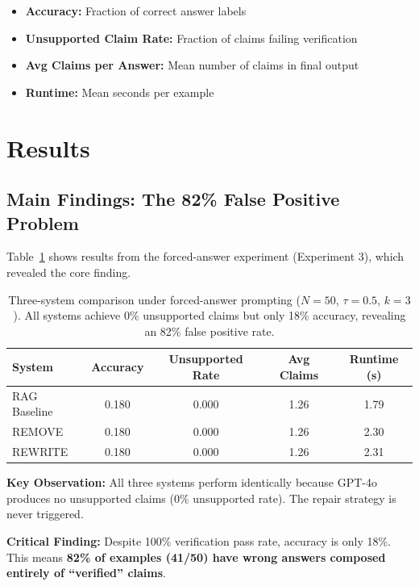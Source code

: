 \documentclass[11pt]{article}
\begin{document}
\begin{itemize}
\item \textbf{Accuracy:} Fraction of correct answer labels
\item \textbf{Unsupported Claim Rate:} Fraction of claims failing verification
\item \textbf{Avg Claims per Answer:} Mean number of claims in final output
\item \textbf{Runtime:} Mean seconds per example
\end{itemize}

\section{Results}

\subsection{Main Findings: The 82\% False Positive Problem}

Table~\ref{tab:main_results} shows results from the forced-answer experiment (Experiment 3), which revealed the core finding.

\begin{table}[h]
\centering
\caption{Three-system comparison under forced-answer prompting ($N=50$, $\tau=0.5$, $k=3$). All systems achieve 0\% unsupported claims but only 18\% accuracy, revealing an 82\% false positive rate.}
\label{tab:main_results}
\begin{tabular}{lcccc}
\toprule
\textbf{System} & \textbf{Accuracy} & \textbf{Unsupported Rate} & \textbf{Avg Claims} & \textbf{Runtime (s)} \\
\midrule
RAG Baseline & 0.180 & 0.000 & 1.26 & 1.79 \\
REMOVE & 0.180 & 0.000 & 1.26 & 2.30 \\
REWRITE & 0.180 & 0.000 & 1.26 & 2.31 \\
\bottomrule
\end{tabular}
\end{table}

\textbf{Key Observation:} All three systems perform identically because GPT-4o produces no unsupported claims ($0\%$ unsupported rate). The repair strategy is never triggered.

\textbf{Critical Finding:} Despite 100\% verification pass rate, accuracy is only 18\%. This means \textbf{82\% of examples (41/50) have wrong answers composed entirely of ``verified'' claims}.
\end{document}
